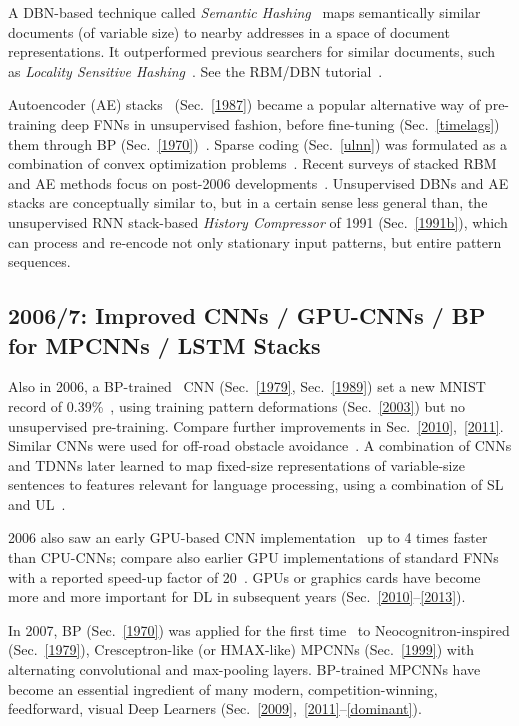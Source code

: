 \documentclass[letterpaper]{article}
\begin{document}
\begin{CJK*}{UTF8}{gbsn}
\begin{sloppypar}
A DBN-based technique called
{\em Semantic Hashing}~\citep{salakhutdinov2009}
maps semantically similar documents (of variable size) to nearby addresses in 
a space of document representations. It
outperformed previous searchers for similar documents, 
such as {\em Locality Sensitive Hashing}~\citep{buhler2001,datar2004}.
See the RBM/DBN tutorial~\citep{fischer:13}.


Autoencoder (AE) stacks~\citep{ballard1987modular} (Sec.~\ref{1987}) 
became a popular alternative way of pre-training deep FNNs in 
unsupervised fashion, before fine-tuning (Sec.~\ref{timelags}) them through BP (Sec.~\ref{1970})~\citep{bengio2006,vincent:2008,erhan:10whydoes}. 
Sparse coding (Sec.~\ref{ulnn}) was formulated as 
a combination of convex optimization 
problems~\citep{sparse2007ng}.
Recent surveys of stacked RBM and AE methods focus
on post-2006 developments~\citep{bengio09,itamar2010}.
Unsupervised DBNs and AE stacks are conceptually similar to, but in a certain sense less general than, the
unsupervised RNN stack-based {\em History Compressor}
 of 1991 (Sec.~\ref{1991b}), which can process and re-encode
not only stationary input patterns, but 
entire pattern sequences. 



\subsection{2006/7: Improved CNNs / GPU-CNNs / BP for MPCNNs / LSTM Stacks}
\label{2007}


Also in 2006, a BP-trained~\citep{LeCun:89} CNN (Sec.~\ref{1979}, Sec.~\ref{1989}) 
set a new MNIST record of 0.39\%~\citep{ranzato-06},
using training pattern
deformations (Sec.~\ref{2003}) but no unsupervised pre-training.
Compare further improvements in Sec.~\ref{2010},~\ref{2011}.
Similar CNNs were used for off-road obstacle avoidance~\citep{LeCun:06}.
A combination of CNNs and TDNNs later learned to map fixed-size representations of
variable-size sentences to features
relevant for language processing, 
using a combination of SL and UL~\citep{weston2008}.


2006 also saw an early GPU-based CNN implementation~\citep{chellapilla:2006b} up to 4 times faster
than CPU-CNNs;
compare also earlier GPU implementations of standard FNNs with a reported speed-up factor of 20~\citep{gpu2004}.
GPUs or graphics cards  have become more and more important for DL in 
subsequent years (Sec.~\ref{2010}--\ref{2013}).

In 2007, BP (Sec.~\ref{1970}) was applied for the first time~\citep{ranzato-cvpr-07}  to 
Neocognitron-inspired (Sec.~\ref{1979}),
Cresceptron-like (or HMAX-like) MPCNNs (Sec.~\ref{1999})
with alternating convolutional and max-pooling layers.
BP-trained MPCNNs  have become an 
essential ingredient of many modern, competition-winning, feedforward, visual Deep Learners (Sec.~\ref{2009},~\ref{2011}--\ref{dominant}). 


\end{sloppypar}
\end{CJK*}
\end{document}
